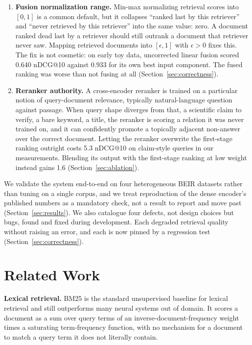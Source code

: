\documentclass[11pt]{article}
\begin{document}
\begin{enumerate}
\item \textbf{Fusion normalization range.} Min-max normalizing retrieval scores into $[0,1]$ is a common default, but it collapses ``ranked last by this retriever'' and ``never retrieved by this retriever'' into the same value: zero. A document ranked dead last by a retriever should still outrank a document that retriever never saw. Mapping retrieved documents into $[\epsilon, 1]$ with $\epsilon > 0$ fixes this. The fix is not cosmetic: on early toy data, uncorrected linear fusion scored 0.640 nDCG@10 against 0.933 for its own best input component. The fused ranking was worse than not fusing at all (Section~\ref{sec:correctness}).
\item \textbf{Reranker authority.} A cross-encoder reranker is trained on a particular notion of query-document relevance, typically natural-language question against passage. When query shape diverges from that, a scientific claim to verify, a bare keyword, a title, the reranker is scoring a relation it was never trained on, and it can confidently promote a topically adjacent non-answer over the correct document. Letting the reranker overwrite the first-stage ranking outright costs 5.3 nDCG@10 on claim-style queries in our measurements. Blending its output with the first-stage ranking at low weight instead gains 1.6 (Section~\ref{sec:ablation}).
\end{enumerate}

We validate the system end-to-end on four heterogeneous BEIR datasets rather than tuning on a single corpus, and we treat reproduction of the dense encoder's published numbers as a mandatory check, not a result to report and move past (Section~\ref{sec:results}). We also catalogue four defects, not design choices but bugs, found and fixed during development. Each degraded retrieval quality without raising an error, and each is now pinned by a regression test (Section~\ref{sec:correctness}).

\section{Related Work}
\label{sec:related}

\textbf{Lexical retrieval.} BM25 \citep{robertson2009probabilistic} is the standard unsupervised baseline for lexical retrieval and still outperforms many neural systems out of domain. It scores a document as a sum over query terms of an inverse-document-frequency weight times a saturating term-frequency function, with no mechanism for a document to match a query term it does not literally contain.
\end{document}
